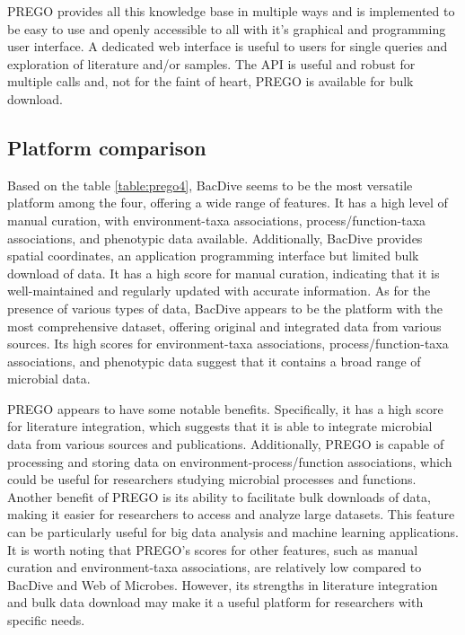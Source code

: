 PREGO provides all this knowledge base in multiple 
ways and is implemented to be easy to use and openly accessible to all with it’s graphical and programming user interface.
A dedicated web interface is useful to users for single queries
and exploration of literature and/or samples. The API is useful and 
robust for multiple calls and, not for the faint of heart, PREGO is 
available for bulk download. 

   \subsection{Platform comparison}
   \label{subsec:prego-similar-platforms}


Based on the table \ref{table:prego4}, BacDive seems to be the most versatile
platform among the four, offering a wide range of features. It has a high level
of manual curation, with environment-taxa associations, process/function-taxa
associations, and phenotypic data available. Additionally, BacDive provides
spatial coordinates, an application programming interface but limited bulk download of data.
It has a high score for manual curation, indicating that it is well-maintained and regularly updated with accurate information.
As for the presence of various types of data, BacDive appears to be the platform
with the most comprehensive dataset, offering original and integrated data from
various sources. Its high scores for environment-taxa associations,
process/function-taxa associations, and phenotypic data suggest that it contains a broad range of microbial data.

PREGO appears to have some notable benefits. Specifically, it has a high score
for literature integration, which suggests that it is able to integrate microbial
data from various sources and publications. Additionally, PREGO is capable of
processing and storing data on environment-process/function associations, which
could be useful for researchers studying microbial processes and functions.
Another benefit of PREGO is its ability to facilitate bulk downloads of data,
making it easier for researchers to access and analyze large datasets.
This feature can be particularly useful for big data analysis and machine learning applications.
It is worth noting that PREGO's scores for other features, such as manual
curation and environment-taxa associations, are relatively low compared to
BacDive and Web of Microbes. However, its strengths in literature integration
and bulk data download may make it a useful platform for researchers with specific needs.


